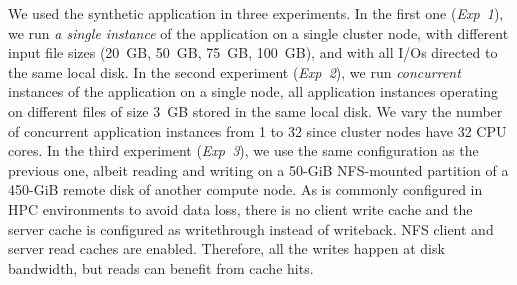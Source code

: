 \documentclass[conference]{IEEEtran}
\begin{document}
        We used the synthetic application in three experiments. In the
        first one (\textit{Exp~1}), we run \emph{a single instance} of
        the application on a single cluster node, with different input file
        sizes (20~GB, 50~GB, 75~GB, 100~GB), and with all I/Os directed to
        the same local disk.
        In the second experiment (\textit{Exp~2}), we run
        \emph{concurrent} instances of the application on a single node,
        all application instances operating on different files of size 3~GB
        stored in the same local disk. We vary the number of concurrent
        application instances from 1 to 32 since cluster nodes have 32 CPU
        cores.
        In the third experiment (\textit{Exp~3}), we use the same
        configuration as the previous one, albeit reading and writing
        on a 50-GiB NFS-mounted partition of a 450-GiB remote disk of
        another compute node. As is commonly configured in HPC
        environments to avoid data loss, there is no client write cache
        and the server cache is configured as writethrough instead of
        writeback. NFS client and server read caches are enabled. 
        Therefore, all the writes happen at disk bandwidth, but
        reads can benefit from cache hits.
\end{document}
